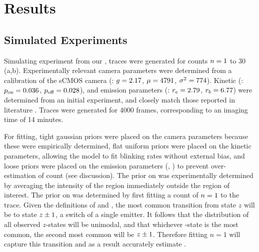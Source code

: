 \section{Results}






\subsection{Simulated Experiments}
Simulating experiment from our \hmm, traces were generated for counts $n=1$ to 30
	(a,b).
	Experimentally relevant camera parameters were determined from a calibration of the
	sCMOS camera (\parametersc: $g=2.17$, $\mu=4791$, $\sigma^2=774$). 
	Kinetic (\parameterst: $p_\text{on}=0.036$, $p_\text{off}=0.028$), and emission parameters 
	(\parameterse: $r_e=2.79$, $r_b=6.77$) were determined from an
	initial experiment, and closely match those reported in literature \cite{stein_2021}.
	Traces were generated for 4000 frames, corresponding to an imaging time of 14 minutes.

For fitting, tight gaussian priors were placed on the camera parameters because these were empirically determined,
	flat uniform priors were placed on the kinetic parameters, allowing the model 
	to fit blinking rates without external bias,
	and loose priors were placed on the emission parameters (\rb, \re) to prevent 
	over-estimation of count (see discussion). 
	The prior on \rb was experimentally determined by averaging the 
	intensity of the region immediately outside the region of interest.
	The prior on \re was determined by first fitting a count of $n=1$ to the trace.
	Given the definitions of \pon and \poff, the most common transition 
	from state $z$ will be to state $z_{} \pm 1$, a switch of a single emitter.
	It follows that the distribution of all observed $z$-states will be unimodal, 
	and that whichever \z{}-state is the most common, the second most common 
	will be $z_{} \pm 1$. 
	Therefore fitting $n=1$ will capture this transition and as a result 
	accurately estimate \re.
	

